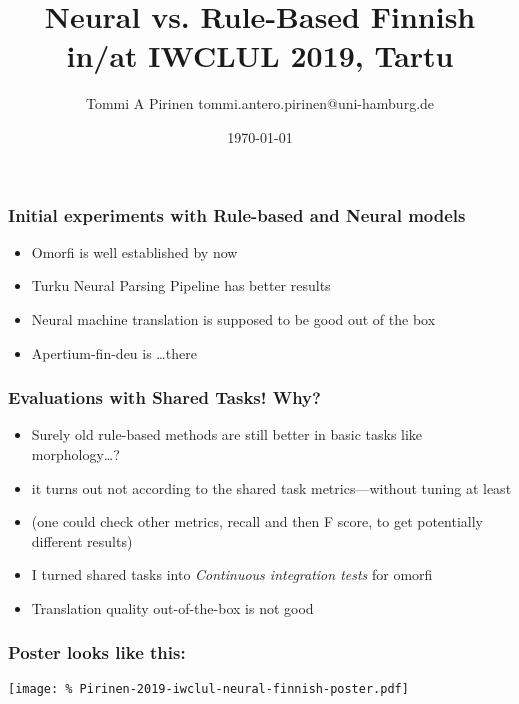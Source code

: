 \documentclass{beamer}
\title{Neural vs. Rule-Based Finnish\\
\scriptsize{in/at IWCLUL 2019, Tartu}}
\author{Tommi A Pirinen\scriptsize
\guilsinglleft{}tommi.antero.pirinen@uni-hamburg.de\guilsinglright{}}
\institute{Universität Hamburg\\
Hamburger Zentrum für Sprachkorpora}
\date{\today}
\begin{document}

\maketitle

\begin{frame}
    \frametitle{Initial experiments with Rule-based and Neural models}
    \begin{itemize}
        \item Omorfi is well established by now
        \item Turku Neural Parsing Pipeline has better results
        \item Neural machine translation is supposed to be good out of the box
        \item Apertium-fin-deu is \ldots there
    \end{itemize}
\end{frame}


\begin{frame}
    \frametitle{Evaluations with Shared Tasks! Why?}
    \begin{itemize}
        \item Surely old rule-based methods are still better in basic tasks like
            morphology\ldots?
        \item it turns out not according to the shared task metrics---without
            tuning at least
        \item (one could check other metrics, recall and then F score, to get
            potentially different results)
        \item I turned shared tasks into \textit{Continuous integration tests}
            for omorfi
        \item Translation quality out-of-the-box is not good
    \end{itemize}
\end{frame}

\begin{frame}
    \frametitle{Poster looks like this:}
    \texttt{[image: \%
        Pirinen-2019-iwclul-neural-finnish-poster.pdf]}
\end{frame}
\end{document}
